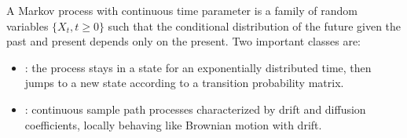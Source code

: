 A Markov process with continuous time parameter is a family of random variables $\{X_t, t \geq 0\}$ such that the conditional distribution of the future given the past and present depends only on the present. Two important classes are:
\begin{itemize}
\item {}: the process stays in a state for an exponentially distributed time, then jumps to a new state according to a transition probability matrix.
\item {}: continuous sample path processes characterized by drift and diffusion coefficients, locally behaving like Brownian motion with drift.
\end{itemize}
